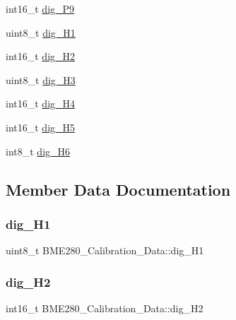 \begin{DoxyCompactItemize}
int16\+\_\+t \hyperlink{struct_b_m_e280___calibration___data_a910fb70ff51f5ef74ed3505c1b0c84ea}{dig\+\_\+\+P9}
\item 
uint8\+\_\+t \hyperlink{struct_b_m_e280___calibration___data_ab20fe551cbfeaa59acb8c99c7a753615}{dig\+\_\+\+H1}
\item 
int16\+\_\+t \hyperlink{struct_b_m_e280___calibration___data_a7af58c15d98d89d14642d762e6c50002}{dig\+\_\+\+H2}
\item 
uint8\+\_\+t \hyperlink{struct_b_m_e280___calibration___data_a28e3e87e63ac47827c9a4117bacc9554}{dig\+\_\+\+H3}
\item 
int16\+\_\+t \hyperlink{struct_b_m_e280___calibration___data_ae8ce5729a103049678339b6edd2b8282}{dig\+\_\+\+H4}
\item 
int16\+\_\+t \hyperlink{struct_b_m_e280___calibration___data_aefab72b5552fcd14bdce545a6d046e6b}{dig\+\_\+\+H5}
\item 
int8\+\_\+t \hyperlink{struct_b_m_e280___calibration___data_a17d849f65e781eeec8d861a4dc874f76}{dig\+\_\+\+H6}
\end{DoxyCompactItemize}


\subsection{Member Data Documentation}
\mbox{\label{struct_b_m_e280___calibration___data_ab20fe551cbfeaa59acb8c99c7a753615}} 
\subsubsection{\texorpdfstring{dig\+\_\+\+H1}{dig\_H1}}
{\footnotesize\ttfamily uint8\+\_\+t B\+M\+E280\+\_\+\+Calibration\+\_\+\+Data\+::dig\+\_\+\+H1}

\mbox{\label{struct_b_m_e280___calibration___data_a7af58c15d98d89d14642d762e6c50002}} 
\subsubsection{\texorpdfstring{dig\+\_\+\+H2}{dig\_H2}}
{\footnotesize\ttfamily int16\+\_\+t B\+M\+E280\+\_\+\+Calibration\+\_\+\+Data\+::dig\+\_\+\+H2}

